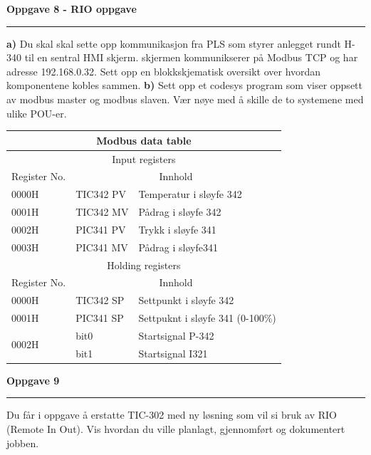 \textbf{Oppgave 8 - RIO oppgave}
\vskip 5pt
\hrule

\vskip 5pt
\textbf{a) }Du skal skal sette opp kommunikasjon fra PLS som styrer anlegget rundt H-340 til en sentral HMI skjerm. skjermen kommunikserer på Modbus TCP og har adresse 192.168.0.32. Sett opp en blokkskjematisk oversikt over hvordan komponentene kobles sammen. 
\vskip 10pt 
\textbf{b) }Sett opp et codesys program som viser oppsett av modbus master og modbus slaven. Vær nøye med å skille de to systemene med ulike POU-er.
\small

\begin{center}
\begin{tabular}{ | m{2cm} | m{2.5cm}| m{11cm} |} 
\hline
\multicolumn{3}{|c|}{Modbus data table} \\
\hline
\multicolumn{3}{|c|}{Input registers}\\
\hline
Register No.&\multicolumn{2}{c|}{Innhold} \\
\hline
0000H&TIC342 PV&Temperatur i sløyfe 342\\
\hline
0001H&TIC342 MV&Pådrag i sløyfe 342\\
\hline
	0002H&PIC341 PV &Trykk i sløyfe 341\\
\hline
	0003H&PIC341 MV& Pådrag i sløyfe341\\
\hline
\multicolumn{3}{|c|}{Holding registers}\\
\hline
Register No.&\multicolumn{2}{c|}{Innhold} \\
\hline
	0000H&TIC342 SP& Settpunkt i sløyfe 342\\
\hline
	0001H&PIC341 SP&Settpuknt i sløyfe 341 (0-100\%)\\
\hline
	\multirow{2}{*}{0002H}&bit0&Startsignal P-342\\
	\cline{2-3}
&bit1&Startsignal I321\\
\hline
\end{tabular}
\end{center}
\normalsize


\filbreak
\vfil \eject
\textbf{Oppgave 9}
\vskip 5pt
\hrule
\vskip 5pt
Du får i oppgave å erstatte TIC-302 med ny løsning som vil si bruk av RIO (Remote In Out). 
\vskip 5pt 
Vis hvordan du ville planlagt, gjennomført og dokumentert jobben. 


\vfil \eject


